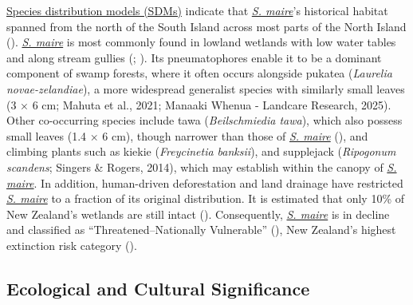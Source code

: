\documentclass[
]{scrreprt}
\begin{document}
\hyperref[acronyms_SDM]{Species distribution models (SDMs)} indicate
that \hyperref[acronyms_SM]{\emph{S. maire}}'s historical habitat
spanned from the north of the South Island across most parts of the
North Island (). \hyperref[acronyms_SM]{\emph{S. maire}} is most commonly
found in lowland wetlands with low water tables and along stream gullies
(;
).
Its pneumatophores enable it to be a dominant component of swamp
forests, where it often occurs alongside pukatea (\emph{Laurelia
novae-zelandiae}), a more widespread generalist species with similarly
small leaves (3 × 6 cm; Mahuta et al., 2021; Manaaki Whenua - Landcare
Research, 2025). Other co-occurring species include tawa
(\emph{Beilschmiedia tawa}), which also possess small leaves (1.4 × 6
cm), though narrower than those of \hyperref[acronyms_SM]{\emph{S.
maire}}
(), and climbing plants such as kiekie
(\emph{Freycinetia banksii}), and supplejack (\emph{Ripogonum scandens};
Singers \& Rogers, 2014), which may establish within the canopy of
\hyperref[acronyms_SM]{\emph{S. maire}}. In addition, human-driven
deforestation and land drainage have restricted
\hyperref[acronyms_SM]{\emph{S. maire}} to a fraction of its original
distribution. It is estimated that only 10\% of New Zealand's wetlands
are still intact (). Consequently, \hyperref[acronyms_SM]{\emph{S. maire}} is in
decline and classified as ``Threatened--Nationally Vulnerable''
(),
New Zealand's highest extinction risk category
().

\subsection{Ecological and Cultural
Significance}\label{ecological-and-cultural-significance}
\end{document}
